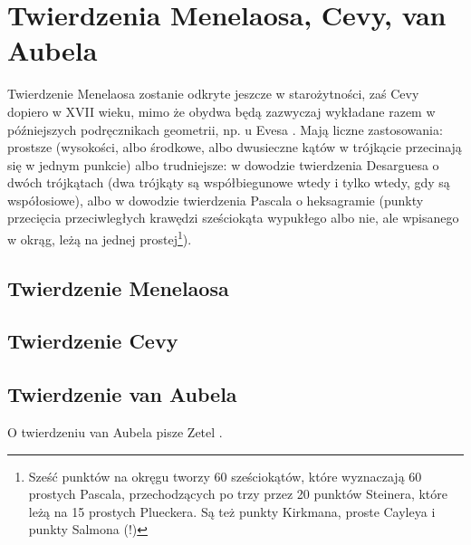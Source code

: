
%

\section{Twierdzenia Menelaosa, Cevy, van Aubela}
Twierdzenie Menelaosa zostanie odkryte jeszcze w starożytności, zaś Cevy dopiero w XVII wieku, mimo że obydwa będą zazwyczaj wykładane razem w późniejszych podręcznikach geometrii, np. u Evesa \cite[s. 63-67]{eves1_1972}.
Mają liczne zastosowania:
prostsze (wysokości, albo środkowe, albo dwusieczne kątów w trójkącie przecinają się w jednym punkcie) albo trudniejsze:
w dowodzie twierdzenia Desarguesa o dwóch trójkątach (dwa trójkąty są współbiegunowe wtedy i tylko wtedy, gdy są współosiowe), %
albo w dowodzie twierdzenia Pascala o heksagramie (punkty przecięcia przeciwległych krawędzi sześciokąta wypukłego albo nie, ale wpisanego w okrąg, leżą na jednej prostej\footnote{Sześć punktów na okręgu tworzy 60 sześciokątów, które wyznaczają 60 prostych Pascala, przechodzących po trzy przez 20 punktów Steinera, które leżą na 15 prostych Plueckera. Są też punkty Kirkmana, proste Cayleya i punkty Salmona (!)}). %


\subsection{Twierdzenie Menelaosa}

\subsection{Twierdzenie Cevy}
 

\subsection{Twierdzenie van Aubela}
O twierdzeniu van Aubela pisze Zetel \cite[s. 24]{zetel_2020}.


